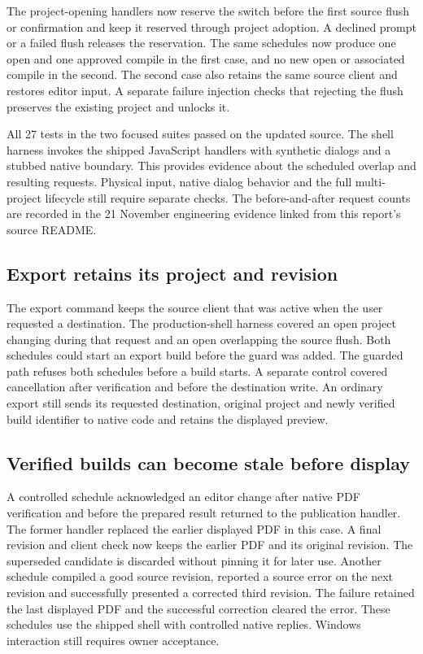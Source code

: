 The project-opening handlers now reserve the switch before the first source
flush or confirmation and keep it reserved through project adoption. A
declined prompt or a failed flush releases the reservation. The same schedules
now produce one open and one approved compile in the first case, and no new
open or associated compile in the second. The second case also retains the
same source client and restores editor input. A separate failure injection
checks that rejecting the flush preserves the existing project and unlocks it.

All 27 tests in the two focused suites passed on the updated source. The shell
harness invokes the shipped JavaScript handlers with synthetic dialogs and a
stubbed native boundary. This provides evidence about the scheduled overlap
and resulting requests. Physical input, native dialog behavior and the
full multi-project lifecycle still require separate checks.
The before-and-after request counts are recorded in the 21 November
engineering evidence linked from this report's source README.

\subsection{Export retains its project and revision}
The export command keeps the source client that was active when the user
requested a destination. The production-shell harness covered an open
project changing during that request and an open overlapping the source
flush. Both schedules could start an export build before the guard was
added. The guarded path refuses both schedules before a build starts.
A separate control covered cancellation after verification and before the
destination write. An ordinary export still sends its requested destination,
original project and newly verified build identifier to native code and
retains the displayed preview.

\subsection{Verified builds can become stale before display}
A controlled schedule acknowledged an editor change after native PDF
verification and before the prepared result returned to the publication
handler. The former handler replaced the earlier displayed PDF in this
case. A final revision and client check now keeps the earlier PDF and its
original revision. The superseded candidate is discarded without pinning
it for later use. Another schedule compiled a good source revision, reported
a source error on the next revision and successfully presented a corrected
third revision. The failure retained the last displayed PDF and the
successful correction cleared the error. These schedules use the shipped
shell with controlled native replies. Windows interaction still requires
owner acceptance.

